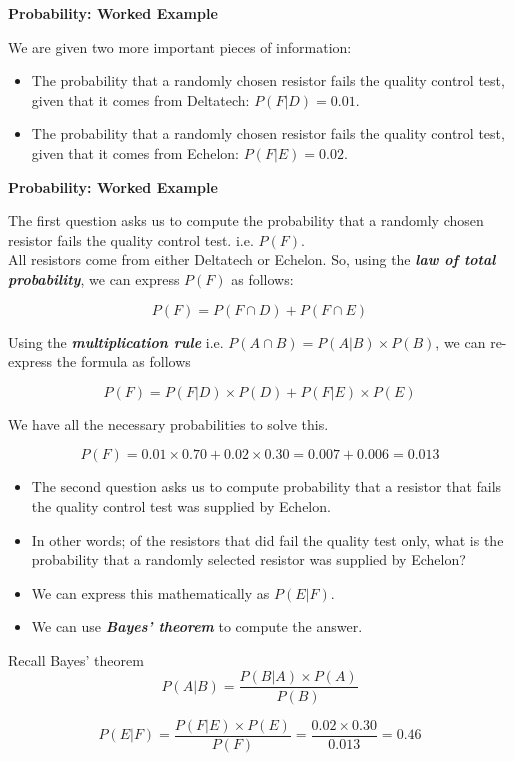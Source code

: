 \documentclass[]{report}
\begin{document}
{
	\noindent \textbf{Probability: Worked Example}
	
	We are given two more important pieces of information:
	\begin{itemize}
		\item The probability that a randomly chosen resistor fails the quality control test, given that it comes from Deltatech: $P(F|D) = 0.01 $.
		\item The probability that a randomly chosen resistor fails the quality control test, given that it comes from Echelon: $P(F|E) = 0.02$.
	\end{itemize}
	
	
	\noindent \textbf{Probability: Worked Example}
	
	The first question asks us to compute the probability that a randomly chosen resistor fails the quality control test. i.e. $P(F)$.\\
	\bigskip
	All resistors come from either Deltatech or Echelon. So, using the \textbf{\emph{law of total probability}}, we can express $P(F)$ as follows:
	
	\[ P(F)  = P(F \cap D) + P(F \cap E) \]
	
	
	
	Using the \textbf{\emph{multiplication rule}}  i.e. $P(A \cap B) = P(A|B) \times P(B)$, we can re-express the formula as follows
	
	\[ P(F)  = P(F|D) \times P(D) + P(F|E) \times P(E) \]
	
	We have all the necessary probabilities to solve this.
	
	\[ P(F)  = 0.01 \times 0.70 + 0.02 \times 0.30   = 0.007 + 0.006  = 0.013\]
	
	
	
	\begin{itemize}
		\item
		The second question asks us to compute probability that a resistor that fails the quality control test was supplied by Echelon.
		\item In other words; of the resistors that did fail the quality test only, what is the probability that a randomly selected resistor was supplied by Echelon?
		\item We can express this mathematically as $P(E|F)$.
		\item We can use \textbf{\emph{Bayes' theorem}} to compute the answer.
	\end{itemize}
	
	
	Recall Bayes' theorem
	\[ P(A|B) = \frac{P(B|A)\times P(A)}{P(B)} \]
	\bigskip
	
	\[ P(E|F) = \frac{P(F|E)\times P(E)}{P(F)}  =  \frac{0.02 \times 0.30}{0.013} = 0.46\]
	
}
\end{document}
